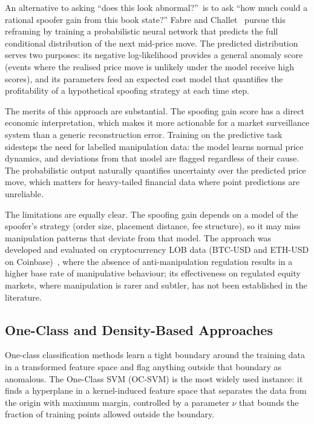 \documentclass[11pt]{report}
\begin{document}
An alternative to asking ``does this look abnormal?''\ is to ask ``how much could a rational spoofer gain from this book state?'' Fabre and Challet~\cite{fabre_2025} pursue this reframing by training a probabilistic neural network that predicts the full conditional distribution of the next mid-price move. The predicted distribution serves two purposes: its negative log-likelihood provides a general anomaly score (events where the realised price move is unlikely under the model receive high scores), and its parameters feed an expected cost model that quantifies the profitability of a hypothetical spoofing strategy at each time step.

The merits of this approach are substantial. The spoofing gain score has a direct economic interpretation, which makes it more actionable for a market surveillance system than a generic reconstruction error. Training on the predictive task sidesteps the need for labelled manipulation data: the model learns normal price dynamics, and deviations from that model are flagged regardless of their cause. The probabilistic output naturally quantifies uncertainty over the predicted price move, which matters for heavy-tailed financial data where point predictions are unreliable.

The limitations are equally clear. The spoofing gain depends on a model of the spoofer's strategy (order size, placement distance, fee structure), so it may miss manipulation patterns that deviate from that model. The approach was developed and evaluated on cryptocurrency LOB data (BTC-USD and ETH-USD on Coinbase)~\cite{fabre_2025}, where the absence of anti-manipulation regulation results in a higher base rate of manipulative behaviour; its effectiveness on regulated equity markets, where manipulation is rarer and subtler, has not been established in the literature.

\subsection{One-Class and Density-Based Approaches}\label{subsec:background:oneclass}

One-class classification methods learn a tight boundary around the training data in a transformed feature space and flag anything outside that boundary as anomalous. The One-Class SVM (OC-SVM) is the most widely used instance: it finds a hyperplane in a kernel-induced feature space that separates the data from the origin with maximum margin, controlled by a parameter $\nu$ that bounds the fraction of training points allowed outside the boundary.
\end{document}

